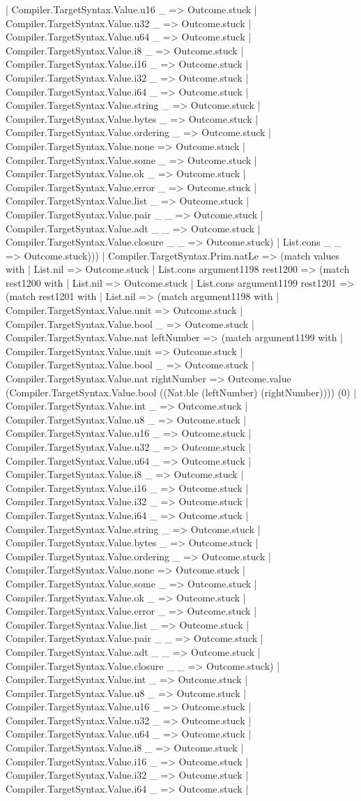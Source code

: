 \documentclass[11pt]{article}
\begin{document}
| Compiler.TargetSyntax.Value.u16 \_ => Outcome.stuck | Compiler.TargetSyntax.Value.u32 \_ => Outcome.stuck | Compiler.TargetSyntax.Value.u64 \_ => Outcome.stuck | Compiler.TargetSyntax.Value.i8 \_ => Outcome.stuck | Compiler.TargetSyntax.Value.i16 \_ => Outcome.stuck | Compiler.TargetSyntax.Value.i32 \_ => Outcome.stuck | Compiler.TargetSyntax.Value.i64 \_ => Outcome.stuck | Compiler.TargetSyntax.Value.string \_ => Outcome.stuck | Compiler.TargetSyntax.Value.bytes \_ => Outcome.stuck | Compiler.TargetSyntax.Value.ordering \_ => Outcome.stuck | Compiler.TargetSyntax.Value.none => Outcome.stuck | Compiler.TargetSyntax.Value.some \_ => Outcome.stuck | Compiler.TargetSyntax.Value.ok \_ => Outcome.stuck | Compiler.TargetSyntax.Value.error \_ => Outcome.stuck | Compiler.TargetSyntax.Value.list \_ => Outcome.stuck | Compiler.TargetSyntax.Value.pair \_ \_ => Outcome.stuck | Compiler.TargetSyntax.Value.adt \_ \_ => Outcome.stuck | Compiler.TargetSyntax.Value.closure \_ \_ => Outcome.stuck) | List.cons \_ \_ => Outcome.stuck))) | Compiler.TargetSyntax.Prim.natLe => (match values with | List.nil => Outcome.stuck | List.cons argument1198 rest1200 => (match rest1200 with | List.nil => Outcome.stuck | List.cons argument1199 rest1201 => (match rest1201 with | List.nil => (match argument1198 with | Compiler.TargetSyntax.Value.unit => Outcome.stuck | Compiler.TargetSyntax.Value.bool \_ => Outcome.stuck | Compiler.TargetSyntax.Value.nat leftNumber => (match argument1199 with | Compiler.TargetSyntax.Value.unit => Outcome.stuck | Compiler.TargetSyntax.Value.bool \_ => Outcome.stuck | Compiler.TargetSyntax.Value.nat rightNumber => Outcome.value (Compiler.TargetSyntax.Value.bool ((Nat.ble (leftNumber) (rightNumber)))) (0) | Compiler.TargetSyntax.Value.int \_ => Outcome.stuck | Compiler.TargetSyntax.Value.u8 \_ => Outcome.stuck | Compiler.TargetSyntax.Value.u16 \_ => Outcome.stuck | Compiler.TargetSyntax.Value.u32 \_ => Outcome.stuck | Compiler.TargetSyntax.Value.u64 \_ => Outcome.stuck | Compiler.TargetSyntax.Value.i8 \_ => Outcome.stuck | Compiler.TargetSyntax.Value.i16 \_ => Outcome.stuck | Compiler.TargetSyntax.Value.i32 \_ => Outcome.stuck | Compiler.TargetSyntax.Value.i64 \_ => Outcome.stuck | Compiler.TargetSyntax.Value.string \_ => Outcome.stuck | Compiler.TargetSyntax.Value.bytes \_ => Outcome.stuck | Compiler.TargetSyntax.Value.ordering \_ => Outcome.stuck | Compiler.TargetSyntax.Value.none => Outcome.stuck | Compiler.TargetSyntax.Value.some \_ => Outcome.stuck | Compiler.TargetSyntax.Value.ok \_ => Outcome.stuck | Compiler.TargetSyntax.Value.error \_ => Outcome.stuck | Compiler.TargetSyntax.Value.list \_ => Outcome.stuck | Compiler.TargetSyntax.Value.pair \_ \_ => Outcome.stuck | Compiler.TargetSyntax.Value.adt \_ \_ => Outcome.stuck | Compiler.TargetSyntax.Value.closure \_ \_ => Outcome.stuck) | Compiler.TargetSyntax.Value.int \_ => Outcome.stuck | Compiler.TargetSyntax.Value.u8 \_ => Outcome.stuck | Compiler.TargetSyntax.Value.u16 \_ => Outcome.stuck | Compiler.TargetSyntax.Value.u32 \_ => Outcome.stuck | Compiler.TargetSyntax.Value.u64 \_ => Outcome.stuck | Compiler.TargetSyntax.Value.i8 \_ => Outcome.stuck | Compiler.TargetSyntax.Value.i16 \_ => Outcome.stuck | Compiler.TargetSyntax.Value.i32 \_ => Outcome.stuck | Compiler.TargetSyntax.Value.i64 \_ => Outcome.stuck | 
\end{document}
